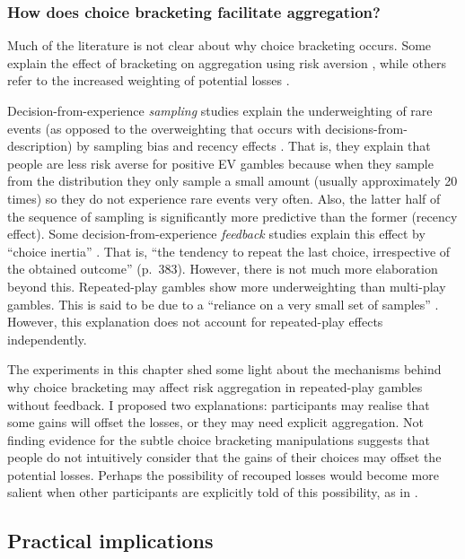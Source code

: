 \documentclass[a4paper, nobind, dvipsnames]{templates/ociamthesis}
\theoremstyle{definition}
\theoremstyle{definition}
\theoremstyle{definition}
\theoremstyle{definition}
\theoremstyle{remark}
\begin{document}
\subsubsection{How does choice bracketing facilitate aggregation?}

Much of the literature \autocite[e.g.,][]{benartzi1999} is not clear about why choice
bracketing occurs. Some explain the effect of bracketing on aggregation using
risk aversion \autocite[e.g.,][]{read1999}, while others refer to the increased weighting
of potential losses \autocite{webb2017}.

Decision-from-experience \emph{sampling} studies explain the underweighting of rare
events (as opposed to the overweighting that occurs with
decisions-from-description) by sampling bias and recency effects \autocites[e.g.,][]{hertwig2004,wulff2018}. That is, they explain that people are less risk
averse for positive EV gambles because when they sample from the distribution
they only sample a small amount (usually approximately 20 times) so they do not
experience rare events very often. Also, the latter half of the sequence of
sampling is significantly more predictive than the former (recency effect). Some
decision-from-experience \emph{feedback} studies explain this effect by ``choice
inertia'' \autocite{camilleri2011}. That is, ``the tendency to repeat the last choice,
irrespective of the obtained outcome'' (p.~383). However, there is not much more
elaboration beyond this. Repeated-play gambles show more underweighting than
multi-play gambles. This is said to be due to a ``reliance on a very small set of
samples'' \autocite[p.~64]{camilleri2013}. However, this explanation does not account
for repeated-play effects independently.

The experiments in this chapter shed some light about the mechanisms behind why
choice bracketing may affect risk aggregation in repeated-play gambles without
feedback. I proposed two explanations: participants may realise that some gains
will offset the losses, or they may need explicit aggregation. Not finding
evidence for the subtle choice bracketing manipulations suggests that people do
not intuitively consider that the gains of their choices may offset the
potential losses. Perhaps the possibility of recouped losses would become more
salient when other participants are explicitly told of this possibility, as in
\textcite{sokolhessner2009}.

\subsection{Practical implications}
\end{document}
